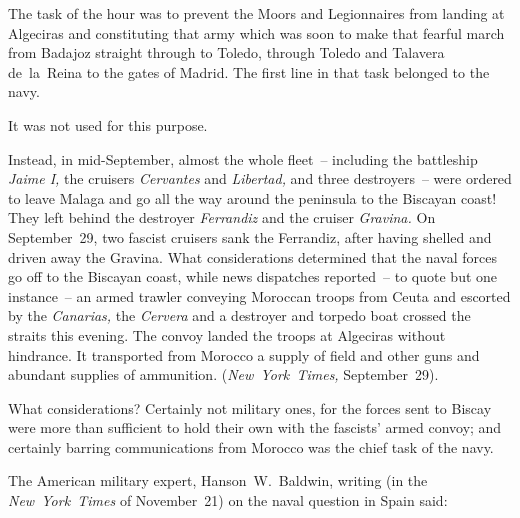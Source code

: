 The task of the hour was to prevent the Moors and Legionnaires from landing at Algeciras and constituting that army which was soon to make that fearful march from Badajoz straight through to Toledo, through Toledo and Talavera de~la~Reina to the gates of Madrid. The first line in that task belonged to the navy.

\smallskip

It was not used for this purpose.

\smallskip

Instead, in mid-September, almost the whole fleet~-- including the battleship \emph{Jaime I,} the cruisers \emph{Cervantes} and \emph{Libertad,} and three destroyers~-- were ordered to leave Malaga and go all the way around the peninsula to the Biscayan coast! They left behind the destroyer \emph{Ferrandiz} and the cruiser \emph{Gravina.} On September~29, two fascist cruisers sank the Ferrandiz, after having shelled and driven away the Gravina. What considerations determined that the naval forces go off to the Biscayan coast, while news dispatches reported~-- to quote but one instance~-- an armed trawler conveying Moroccan troops from Ceuta and escorted by the \emph{Canarias,} the \emph{Cervera} and a destroyer and torpedo boat crossed the straits this evening. The convoy landed the troops at Algeciras without hindrance. It transported from Morocco a supply of field and other guns and abundant supplies of ammunition. (\emph{New~York~Times,} September~29).

What considerations? Certainly not military ones, for the forces sent to Biscay were more than sufficient to hold their own with the fascists’ armed convoy; and certainly barring communications from Morocco was the chief task of the navy.

\medskip

The American military expert, Hanson~W.~Baldwin, writing (in the \emph{New~York~Times} of November~21) on the naval question in Spain said:

